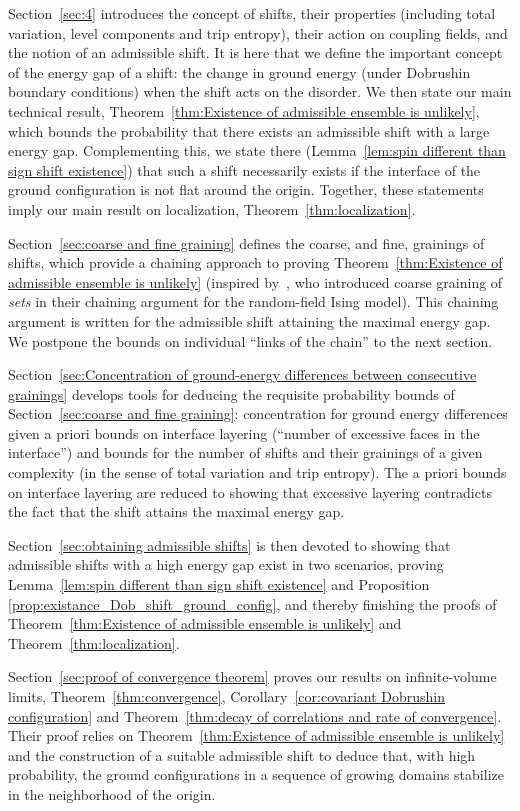 \documentclass[11pt, reqno]{amsart}
\numberwithin{equation}{section}
\begin{document}
Section~\ref{sec:4} introduces the concept of shifts, their properties (including total variation, level components and trip entropy), their action on coupling fields, and the notion of an admissible shift. It is here that we define the important concept of the energy gap of a shift: the change in ground energy (under Dobrushin boundary conditions) when the shift acts on the disorder. We then state our main technical result, Theorem~\ref{thm:Existence of admissible ensemble is unlikely}, which bounds the probability that there exists an admissible shift with a large energy gap. Complementing this, we state there (Lemma~\ref{lem:spin different than sign shift existence}) that such a shift necessarily exists if the interface of the ground configuration is not flat around the origin. Together, these statements imply our main result on localization, Theorem~\ref{thm:localization}.

Section~\ref{sec:coarse and fine graining} defines the coarse, and fine, grainings of shifts, which provide a chaining approach to proving Theorem~\ref{thm:Existence of admissible ensemble is unlikely} (inspired by~\cite{FFS}, who introduced coarse graining of \emph{sets} in their chaining argument for the random-field Ising model). This chaining argument is written for the admissible shift attaining the maximal energy gap. We postpone the bounds on individual ``links of the chain'' to the next section.

Section~\ref{sec:Concentration of ground-energy differences between consecutive grainings} develops tools for deducing the requisite probability bounds of Section~\ref{sec:coarse and fine graining}: concentration for ground energy differences given a priori bounds on interface layering (``number of excessive faces in the interface'') and bounds for the number of shifts and their grainings of a given complexity (in the sense of total variation and trip entropy). The a priori bounds on interface layering are reduced to showing that excessive layering contradicts the fact that the shift attains the maximal energy gap.

Section~\ref{sec:obtaining admissible shifts} is then devoted to showing that admissible shifts with a high energy gap exist in two scenarios, proving Lemma~\ref{lem:spin different than sign shift existence} and Proposition \ref{prop:existance_Dob_shift_ground_config}, and thereby finishing the proofs of Theorem~\ref{thm:Existence of admissible ensemble is unlikely} and Theorem~\ref{thm:localization}.

Section~\ref{sec:proof of convergence theorem} proves our results on infinite-volume limits, Theorem~\ref{thm:convergence}, Corollary~\ref{cor:covariant Dobrushin configuration} and Theorem~\ref{thm:decay of correlations and rate of convergence}. Their proof relies on Theorem~\ref{thm:Existence of admissible ensemble is unlikely} and the construction of a suitable admissible shift to deduce that, with high probability, the ground configurations in a sequence of growing domains stabilize in the neighborhood of the origin.
\end{document}
